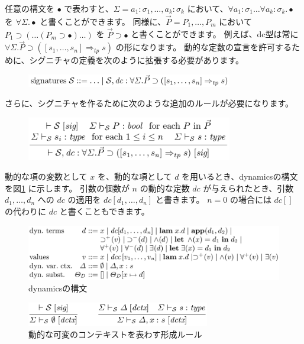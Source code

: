 \documentclass[submit,techreq,noauthor,onecolumn]{ipsj}
\begin{document}
任意の構文を $\bullet$ で表わすと、$\Sigma = a_1 : \sigma_1,\ldots,a_k : \sigma_k$ において、$\forall a_1:\sigma_1 \ldots \forall a_k:\sigma_k .\bullet$ を $\forall\Sigma.\bullet$ と書くことができます。
同様に、$\vec{P} = P_1,\ldots,P_m$ において $P_1 \supset (\ldots(P_m \supset \bullet)\ldots)$ を $\vec{P} \supset \bullet$ と書くことができます。
例えば、dc型は常に $\forall \Sigma.\vec{P} \supset ([s_1,\ldots,s_n] \Rightarrow_{tp} s)$ の形になります。
動的な定数の宣言を許可するために、シグニチャの定義を次のように拡張する必要があります。

\begin{figure}[h]
\centering
\includegraphics[width=9cm]{img/infig22_dynamic_sig.png}
\end{figure}

\noindent さらに、シグニチャを作るために次のような追加のルールが必要になります。

\begin{figure}[h]
\centering
\includegraphics[width=9cm]{img/infig22_addtional_rule.png}
\end{figure}

\noindent 動的な項の変数として $x$ を、動的な項として $d$ を用いるとき、dynamicsの構文を図\ref{fig:fig3_syntax_dynamics} に示します。
引数の個数が $n$ の動的な定数 $dc$ が与えられたとき、引数 $d_1,\ldots,d_n$ への $dc$ の適用を $dc[d_1,\ldots,d_n]$ と書きます。
$n = 0$ の場合には $dc[]$ の代わりに $dc$ と書くこともできます。

\begin{figure}[h]
\centering
\includegraphics[width=14cm]{img/fig3_syntax_dynamics.png}
\caption{dynamicsの構文}
\label{fig:fig3_syntax_dynamics}
\end{figure}

\begin{figure}[h]
\centering
\includegraphics[width=8cm]{img/fig4_rules_dynamics.png}
\caption{動的な可変のコンテキストを表わす形成ルール}
\label{fig:fig4_rules_dynamics}
\end{figure}
\end{document}
